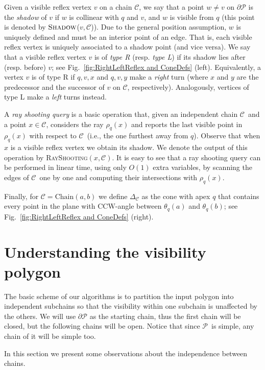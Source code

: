 \documentclass[a4paper]{article}
\newcommand{\Poly}{\ensuremath{\mathcal{P}}}               \newcommand{\bd}{\ensuremath{\partial \Poly} }                 \newcommand{\Vis}{\ensuremath{\mathrm{Vis}_\Poly}} \newcommand{\VisC}{\ensuremath{\mathrm{Vis}_{\mathcal{C}}}} \newcommand{\VisCprime}{\ensuremath{\mathrm{Vis}_{\mathcal{C'}}}} \newcommand{\E}{\ensuremath{\mathrm{E}}}                    \newcommand{\Rin}{\ensuremath{r}}      \newcommand{\Rout}{\ensuremath{\bar{r}}}      \newcommand{\Hout}{\ensuremath{\bar{h}}}      \newcommand{\chain}{\ensuremath{{\mathrm{Chain}}}}     \newcommand{\region}{\ensuremath{{{\mathcal R}}}}
\newcommand{\coneC}{\ensuremath{{{\Delta_{\mathcal C}}}}}
\newcommand{\C}{\ensuremath{{\mathcal C}}}
\begin{document}
Given a visible reflex vertex $v$ on a chain $\C$, we say that a point $w\neq v$ on $\bd$ is the \emph{shadow} of $v$ if $w$ is collinear with $q$ and $v$, and $w$ is visible from $q$ (this point is denoted by $\textsc{Shadow}$($v,\C$)). Due to the general position assumption, $w$ is uniquely defined and  must be an interior point of an edge. That is, each visible reflex vertex is uniquely associated to a shadow point (and vice versa). We say that a visible reflex vertex $v$ is of \emph{type R} (resp. \emph{type L}) if its shadow lies after (resp. before) $v$; see Fig.~\ref{fig:RightLeftReflex and ConeDefs} (left). 
Equivalently, a vertex $v$ is of type R if $q,v,x$ and $q,v,y$ make a \emph{right} turn (where $x$ and $y$ are the predecessor and the successor of $v$ on $\C$, respectively). 
Analogously, vertices of type L make a \emph{left} turns instead. 

A \emph{ray shooting query} is a basic operation that, given an independent chain \C\ and a point $x\in \C$, considers the ray $\rho_q(x)$ and reports the last visible point in $\rho_q(x)$ with respect to \C\ (i.e., the one furthest away from $q$). Observe that when $x$ is a visible reflex vertex we obtain its shadow. We denote the output of this operation by \textsc{RayShooting}$(x, \mathcal{C})$. It is easy to see that a ray shooting query can be performed in linear time, using only $O(1)$ extra variables, by scanning the edges of \C\ one by one and computing their intersections with $\rho_q(x)$. 

Finally, for $\C = \chain(a,b)$  we define $\coneC$ as the cone with apex $q$ that contains every point in the plane with CCW-angle between $\theta_q(a)$ and $\theta_q(b)$; see Fig.~\ref{fig:RightLeftReflex and ConeDefs} (right).




\section{Understanding the visibility polygon}
\label{sec:SimpleAlgorithm}
The basic scheme of our algorithms is to partition the input polygon into independent subchains so that the visibility within one subchain is unaffected by the others. We will use $\bd$ as the starting chain, thus the first chain will be closed, but the following chains will be open. Notice that since \Poly\ is simple, any chain of it will be simple too. 

In this section we present some observations about the independence between chains.
\end{document}
